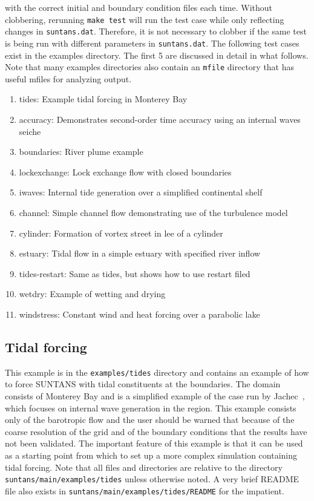 with the correct initial and boundary condition files each time.  Without clobbering,
rerunning \verb+make test+ will run the test case while only reflecting changes in \verb+suntans.dat+.
Therefore, it is not necessary to clobber if the same test is being run with different 
parameters in \verb+suntans.dat+.  The following test cases exist in the examples
directory.  The first 5 are discussed in detail in what follows.  Note that many examples
directories also contain an \verb+mfile+ directory that has useful mfiles for analyzing output.
\begin{enumerate}
\item tides: Example tidal forcing in Monterey Bay
\item accuracy: Demonstrates second-order time accuracy using an internal waves seiche
\item boundaries: River plume example
\item lockexchange: Lock exchange flow with closed boundaries
\item iwaves: Internal tide generation over a simplified continental shelf
\item channel: Simple channel flow demonstrating use of the turbulence model
\item cylinder: Formation of vortex street in lee of a cylinder
\item estuary: Tidal flow in a simple estuary with specified river inflow
\item tides-restart: Same as tides, but shows how to use restart filed
\item wetdry: Example of wetting and drying
\item windstress: Constant wind and heat forcing over a parabolic lake
\end{enumerate}

\subsection{Tidal forcing} \label{sec:tidalforcing}

This example is in the \verb+examples/tides+ directory and contains an example of how
to force SUNTANS with tidal constituents at the boundaries.  The domain consists of
Monterey Bay and is a simplified example of the case run by Jachec\etal~\cite{JACHEC[2006]},
which focuses on internal wave generation in the region.  This example consists only of the
barotropic flow and the user should be warned that because of the coarse resolution of the
grid and of the boundary conditions that the results have not been validated.  The important feature of
this example is that it can be used as a starting point from which to set up a more
complex simulation containing tidal forcing.  Note that all files and directories are relative
to the directory \verb+suntans/main/examples/tides+ unless otherwise noted.  A very brief
README file also exists in \verb+suntans/main/examples/tides/README+ for the impatient.

